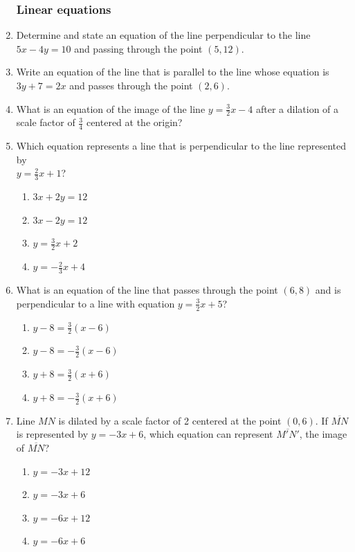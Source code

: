 \documentclass[12pt, oneside]{article}
\begin{document}
\begin{enumerate}[itemsep=0cm]
\newpage
\subsubsection*{Linear equations}
\item Determine and state an equation of the line perpendicular to the line\\ $5x-4y=10$ and passing through the point $(5,12)$.

\item Write an equation of the line that is parallel to the line whose equation is $3y+7=2x$ and passes through the point $(2,6)$.

\item What is an equation of the image of the line $\displaystyle y=\frac{3}{2}x-4$ after a dilation of a scale factor of $\displaystyle \frac{3}{4}$ centered at the origin?

\item Which equation represents a line that is perpendicular to the line represented by\\[0.25cm] $\displaystyle y=\frac{2}{3}x+1$?
  \begin{multicols}{2}
    \begin{enumerate}
      \item $3x+2y=12$
      \item $3x-2y=12$ 
      \item $\displaystyle y=\frac{3}{2}x+2$
      \item $\displaystyle y=-\frac{2}{3}x+4$
    \end{enumerate}
  \end{multicols}

\item What is an equation of the line that passes through the point $(6,8)$ and is perpendicular to a line with equation $y=\frac{3}{2}x+5$?
  \begin{multicols}{2}
    \begin{enumerate}
      \item $y-8=\frac{3}{2}(x-6)$
      \item $y-8=-\frac{3}{2}(x-6)$ 
      \item $y+8=\frac{3}{2}(x+6)$
      \item $y+8=-\frac{3}{2}(x+6)$
    \end{enumerate}
  \end{multicols}

\item Line $MN$ is dilated by a scale factor of 2 centered at the point $(0,6)$. If $\overline{MN}$ is represented by $y=-3x+6$, which equation can represent $\overline{M'N'}$, the image of $\overline{MN}$?
  \begin{multicols}{2}
    \begin{enumerate}
      \item $y=-3x+12$
      \item $y=-3x+6$ 
      \item $y=-6x+12$
      \item $y=-6x+6$
    \end{enumerate}
  \end{multicols}


\end{enumerate}
\end{document}
